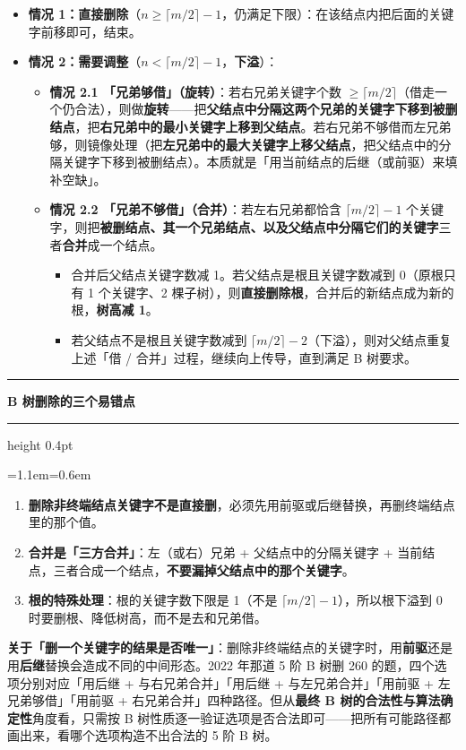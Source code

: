 \documentclass[11pt,openany,UTF8]{ctexbook}
\newcommand{\callouthead}[2]{%
  \par\addvspace{7pt}\noindent
  {\color{#1}\rule[-0.15em]{3pt}{1.05em}}\hspace{0.5em}%
  {\bfseries\color{#1}#2}\par\nobreak\vspace{-0.35em}%
  {\color{rulesep}\hrule height 0.4pt}\nobreak\vspace{0.45em}%
  \begingroup\small\setlength{\parindent}{0pt}%
  \leftskip=1.1em\rightskip=0.6em\noindent\ignorespaces}
\newcommand{\calloutend}{\par\endgroup\addvspace{7pt}}
\newenvironment{callwarn}[1]{\callouthead{warnbar}{#1}}{\calloutend}
\begin{document}
\begin{itemize}
\item \textbf{情况 1：直接删除}（$n\ge \lceil m/2\rceil-1$，仍满足下限）：在该结点内把后面的关键字前移即可，结束。
\item \textbf{情况 2：需要调整}（$n<\lceil m/2\rceil-1$，\textbf{下溢}）：
\begin{itemize}
\item \textbf{情况 2.1 「兄弟够借」（旋转）}：若右兄弟关键字个数 $\ge \lceil m/2\rceil$（借走一个仍合法），则做\textbf{旋转}——把\textbf{父结点中分隔这两个兄弟的关键字下移到被删结点}，把\textbf{右兄弟中的最小关键字上移到父结点}。若右兄弟不够借而左兄弟够，则镜像处理（把\textbf{左兄弟中的最大关键字上移父结点}，把父结点中的分隔关键字下移到被删结点）。本质就是「用当前结点的后继（或前驱）来填补空缺」。
\item \textbf{情况 2.2 「兄弟不够借」（合并）}：若左右兄弟都恰含 $\lceil m/2\rceil-1$ 个关键字，则把\textbf{被删结点、其一个兄弟结点、以及父结点中分隔它们的关键字}三者\textbf{合并}成一个结点。
\begin{itemize}
\item 合并后父结点关键字数减 1。若父结点是根且关键字数减到 0（原根只有 1 个关键字、2 棵子树），则\textbf{直接删除根}，合并后的新结点成为新的根，\textbf{树高减 1}。
\item 若父结点不是根且关键字数减到 $\lceil m/2\rceil-2$（下溢），则对父结点重复上述「借 / 合并」过程，继续向上传导，直到满足 B 树要求。
\end{itemize}
\end{itemize}
\end{itemize}
\begin{callwarn}{B 树删除的三个易错点}
\begin{enumerate}
\item \textbf{删除非终端结点关键字不是直接删}，必须先用前驱或后继替换，再删终端结点里的那个值。
\item \textbf{合并是「三方合并」}：左（或右）兄弟 + 父结点中的分隔关键字 + 当前结点，三者合成一个结点，\textbf{不要漏掉父结点中的那个关键字}。
\item \textbf{根的特殊处理}：根的关键字数下限是 1（不是 $\lceil m/2\rceil-1$），所以根下溢到 0 时要删根、降低树高，而不是去和兄弟借。
\end{enumerate}
\end{callwarn}

\textbf{关于「删一个关键字的结果是否唯一」}：删除非终端结点的关键字时，用\textbf{前驱}还是用\textbf{后继}替换会造成不同的中间形态。2022 年那道 5 阶 B 树删 260 的题，四个选项分别对应「用后继 + 与右兄弟合并」「用后继 + 与左兄弟合并」「用前驱 + 左兄弟够借」「用前驱 + 右兄弟合并」四种路径。但从\textbf{最终 B 树的合法性与算法确定性}角度看，只需按 B 树性质逐一验证选项是否合法即可——把所有可能路径都画出来，看哪个选项构造不出合法的 5 阶 B 树。
\end{document}
